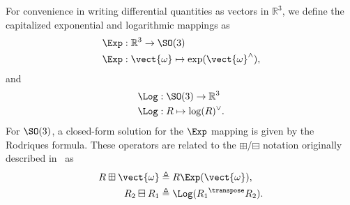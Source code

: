 For convenience in writing differential quantities as vectors in $\mathbb{R}^3$, we define the capitalized exponential and logarithmic mappings as
\begin{align}
\Exp &: \mathbb{R}^3 \to \SO(3) \\
\Exp &: \vect{\omega} \mapsto \exp(\vect{\omega}^\wedge) ,
\end{align}
and
\begin{align}
\Log &: \SO(3) \to \mathbb{R}^3 \\
\Log &: R \mapsto \log(R)^\vee .
\end{align}
For $\SO(3)$, a closed-form solution for the $\Exp$ mapping is given by the Rodriques formula.
These operators are related to the $\boxplus$/$\boxminus$ notation originally described in~\cite{hertzberg2013integrating} as
\begin{align}
R \boxplus \vect{\omega} &\triangleq R \Exp(\vect{\omega}) , \\
R_2 \boxminus R_1 &\triangleq \Log({R_1}^\transpose R_2) .
\end{align}
